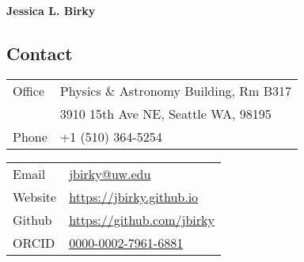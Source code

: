 \documentclass[margin,line]{resume}
\begin{document}
{\sc \textbf{\Large Jessica L. Birky}} 
\vspace{0.3cm}
\begin{resume}

 
\section{\mysidestyle \textcolor{bcolor}{Contact}}


\noindent\begin{multicols}{2}\small
\noindent\begin{tabular}{@{}l|l}
  \multirow{1}{*}{Office}   & Physics \& Astronomy Building, Rm B317  \\
  \multirow{1}{*}{}         & 3910 15th Ave NE, Seattle WA, 98195  \\
  \multirow{1}{*}{Phone}    & +1 (510) 364-5254 \\
\end{tabular}

\noindent\begin{tabular}{@{}l|l}
  \multirow{1}{*}{Email}    &   \href{jbirky@ucsd.edu}{jbirky@uw.edu} \\
  \multirow{1}{*}{Website}  &   \href{https://jbirky.github.io/}{https://jbirky.github.io} \\
  \multirow{1}{*}{Github}   &   \href{https://github.com/jbirky}{https://github.com/jbirky} \\
  \multirow{1}{*}{ORCID}    &   \href{https://orcid.org/0000-0002-7961-6881}{0000-0002-7961-6881} \\
\end{tabular} 
\end{multicols}


\end{resume}
\end{document}
